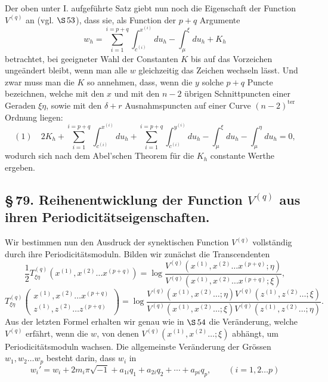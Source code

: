 \documentclass[10pt]{article}
\begin{document}
Der oben unter I. aufgeführte Satz giebt nun noch die Eigenschaft der Function \(V^{(q)}\) an (vgl. \(\S\,53\)), dass sie, als Function der \(p+q\) Argumente
\[
w_h=\sum_{i=1}^{i=p+q}\int_{c^{(i)}}^{x^{(i)}}du_h-\int_{\mu}^{\xi}du_h+K_h
\]
betrachtet, bei geeigneter Wahl der Constanten \(K\) bis auf das Vorzeichen ungeändert bleibt, wenn man alle \(w\) gleichzeitig das Zeichen wechseln lässt. Und zwar muss man die \(K\) so annehmen, dass, wenn die \(y\) solche \(p+q\) Puncte bezeichnen, welche mit den \(x\) und mit den \(n-2\) übrigen Schnittpuncten einer Geraden \(\xi\eta\), sowie mit den \(\delta+r\) Ausnahmspuncten auf einer Curve \((n-2)^{\mathrm{ter}}\) Ordnung liegen:
\[
(1)\quad
2K_h+
\sum_{i=1}^{i=p+q}\int_{c^{(i)}}^{x^{(i)}}du_h+
\sum_{i=1}^{i=p+q}\int_{c^{(i)}}^{y^{(i)}}du_h
-\int_{\mu}^{\xi}du_h-\int_{\mu}^{\eta}du_h=0,
\]
wodurch sich nach dem Abel'schen Theorem für die \(K_h\) constante Werthe ergeben.

\subsection*{\S\,79. Reihenentwicklung der Function \(V^{(q)}\) aus ihren Periodicitätseigenschaften.}

Wir bestimmen nun den Ausdruck der synektischen Function \(V^{(q)}\) vollständig durch ihre Periodicitätsmoduln. Bilden wir zunächst die Transcendenten
\[
\frac12T_{\xi\eta}^{(q)}(x^{(1)},x^{(2)}\ldots x^{(p+q)})
=
\log
\frac{V^{(q)}(x^{(1)},x^{(2)}\ldots x^{(p+q)};\eta)}
     {V^{(q)}(x^{(1)},x^{(2)}\ldots x^{(p+q)};\xi)},
\]
\[
T_{\xi\eta}^{(q)}
\begin{pmatrix}
x^{(1)},x^{(2)}\ldots x^{(p+q)}\\
z^{(1)},z^{(2)}\ldots z^{(p+q)}
\end{pmatrix}
=
\log
\frac{
V^{(q)}(x^{(1)},x^{(2)}\ldots;\eta)
V^{(q)}(z^{(1)},z^{(2)}\ldots;\xi)
}{
V^{(q)}(x^{(1)},x^{(2)}\ldots;\xi)
V^{(q)}(z^{(1)},z^{(2)}\ldots;\eta)
}.
\]
Aus der letzten Formel erhalten wir genau wie in \(\S\,54\) die Veränderung, welche \(V^{(q)}\) erfährt, wenn die \(w\), von denen \(V^{(q)}(x^{(1)},x^{(2)}\ldots;\xi)\) abhängt, um Periodicitätsmoduln wachsen. Die allgemeinste Veränderung der Grössen \(w_1,w_2\ldots w_p\) besteht darin, dass \(w_i\) in
\[
w_i'=w_i+2m_i\pi\sqrt{-1}+a_{1i}q_1+a_{2i}q_2+\cdots+a_{pi}q_p,
\qquad (i=1,2\ldots p)
\]

\end{document}
